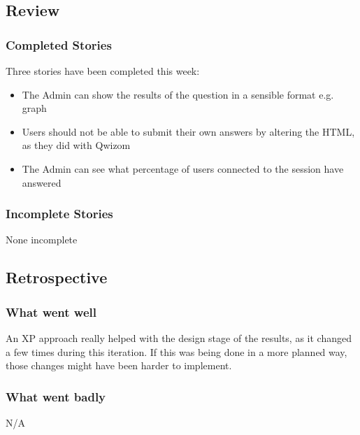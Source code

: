 \subsection{Review}
\subsubsection{Completed Stories}
Three stories have been completed this week:
\begin{itemize}
	\item The Admin can show the results of the question in a sensible format e.g. graph
	\item Users should not be able to submit their own answers by altering the HTML, as they did with Qwizom
	\item The Admin can see what percentage of users connected to the session have answered
\end{itemize}
\subsubsection{Incomplete Stories}
None incomplete

\subsection{Retrospective}
\subsubsection{What went well}
An XP approach really helped with the design stage of the results, as it changed a few times during this iteration. If this was being done in a more planned way, those changes might have been harder to implement.
\subsubsection{What went badly}
N/A
\newpage
